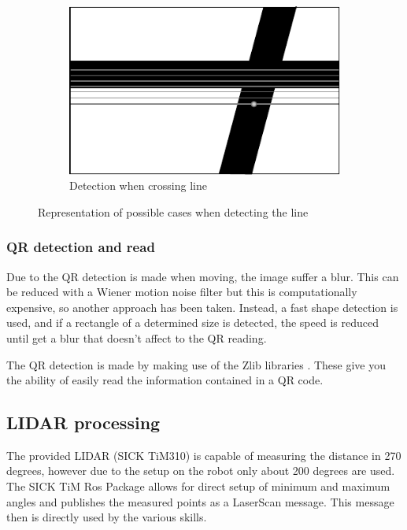 \begin{figure}
\begin{subfigure}[ht!]{0.296\textwidth}
	            \includegraphics[width=\textwidth]{figs/mr_camera_processing_3}
	            \caption{Detection when crossing line}
	            \label{fig:mr_camera_processing_3}
	    	\end{subfigure}
	    \caption{Representation of possible cases when detecting the line}
	    \end{figure}

	\subsubsection{QR detection and read} %
	\label{ssub:qr_detection_and_read}
	Due to the QR detection is made when moving, the image suffer a blur.
	This can be reduced with a Wiener motion noise filter but this is computationally expensive, so another approach has been taken.
	Instead, a fast shape detection is used, and if a rectangle of a determined size is detected, the speed is reduced until get a blur that doesn't affect to the QR reading.

	The QR detection is made by making use of the Zlib libraries \cite{zlib}. 
	These give you the ability of easily read the information contained in a QR code.



	\subsection{LIDAR processing} %
	\label{sub:mr_lidar_processing}
	The provided LIDAR (SICK TiM310) is capable of measuring the distance in 270 degrees, however due to the setup on the robot only about 200 degrees are used. The SICK TiM Ros Package \cite{sick_tim} allows for direct setup of minimum and maximum angles and publishes the measured points as a LaserScan message. This message then is directly used by the various skills.

